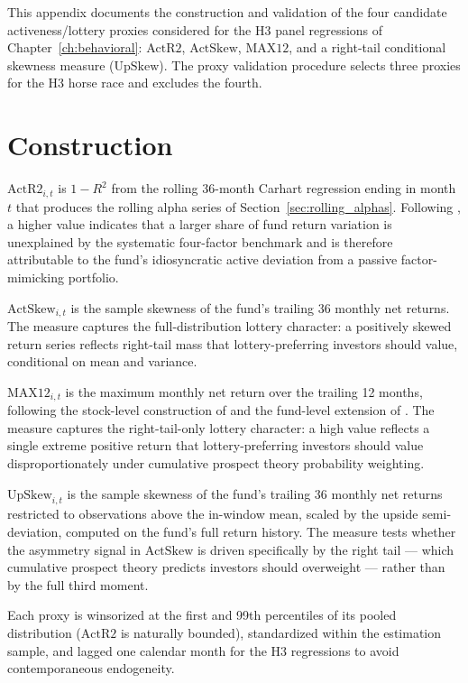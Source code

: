 \documentclass[12pt, oneside]{report}
\begin{document}
\noindent This appendix documents the construction and validation of
the four candidate activeness/lottery proxies considered for the H3
panel regressions of Chapter~\ref{ch:behavioral}: $\text{ActR2}$,
$\text{ActSkew}$, $\text{MAX12}$, and a right-tail conditional
skewness measure ($\text{UpSkew}$). The proxy validation
procedure selects three proxies for the H3 horse race and excludes
the fourth.

\section{Construction}
\label{sec:proxy_construction}

\noindent $\text{ActR2}_{i,t}$ is $1 - R^2$ from the rolling 36-month
Carhart regression ending in month $t$ that produces the rolling alpha
series of Section~\ref{sec:rolling_alphas}. Following
\textcite{AmihudGoyenko2013}, a higher value indicates that a larger
share of fund return variation is unexplained by the systematic
four-factor benchmark and is therefore attributable to the fund's
idiosyncratic active deviation from a passive factor-mimicking
portfolio.

$\text{ActSkew}_{i,t}$ is the sample skewness of the fund's trailing 36
monthly net returns. The measure captures the full-distribution
lottery character: a positively skewed return series reflects
right-tail mass that lottery-preferring investors should value,
conditional on mean and variance.

$\text{MAX12}_{i,t}$ is the maximum monthly net return over the
trailing 12 months, following the stock-level construction of
\textcite{BaliCakiciWhitelaw2011} and the fund-level extension of
\textcite{ChengEtal2025}. The measure captures the right-tail-only
lottery character: a high value reflects a single extreme positive
return that lottery-preferring investors should value
disproportionately under cumulative prospect theory probability
weighting.

$\text{UpSkew}_{i,t}$ is the sample skewness of the fund's trailing 36
monthly net returns restricted to observations above the in-window
mean, scaled by the upside semi-deviation, computed on the fund's full
return history. The measure tests whether
the asymmetry signal in $\text{ActSkew}$ is driven specifically by
the right tail --- which cumulative prospect theory predicts investors
should overweight --- rather than by the full third moment.

Each proxy is winsorized at the first and 99th percentiles of its pooled
distribution ($\text{ActR2}$ is naturally bounded), standardized within
the estimation sample, and lagged one calendar month for the H3
regressions to avoid contemporaneous endogeneity.
\end{document}
